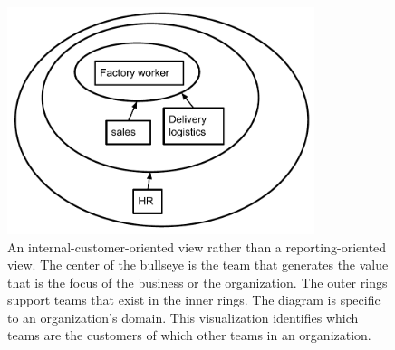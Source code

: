 \begin{figure}
\begin{center}
\includegraphics[width=0.8\textwidth]{images/org_chart_wedding_cake_dependencies_-_manufacturing.pdf}
\end{center}
\caption{An internal-customer-oriented view rather than a reporting-oriented view. The center of the bullseye is the team that generates the value that is the focus of the business or the organization.
The outer rings support teams that exist in the inner rings. The diagram is specific to an organization's domain. This visualization identifies which teams are the customers of which other teams in an organization.}
\label{fig:org_chart_wedding_cake_manufacturing}
\end{figure}



